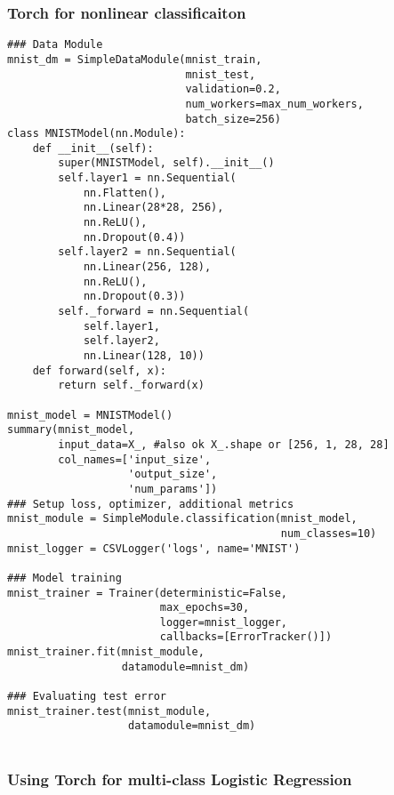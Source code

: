 \documentclass[
  letterpaper,
  DIV=11,
  numbers=noendperiod]{scrreprt}
\begin{document}
\subsubsection{Torch for nonlinear
classificaiton}\label{torch-for-nonlinear-classificaiton}

\begin{verbatim}
### Data Module
mnist_dm = SimpleDataModule(mnist_train,
                            mnist_test,
                            validation=0.2,
                            num_workers=max_num_workers,
                            batch_size=256)
class MNISTModel(nn.Module):
    def __init__(self):
        super(MNISTModel, self).__init__()
        self.layer1 = nn.Sequential(
            nn.Flatten(),
            nn.Linear(28*28, 256),
            nn.ReLU(),
            nn.Dropout(0.4))
        self.layer2 = nn.Sequential(
            nn.Linear(256, 128),
            nn.ReLU(),
            nn.Dropout(0.3))
        self._forward = nn.Sequential(
            self.layer1,
            self.layer2,
            nn.Linear(128, 10))
    def forward(self, x):
        return self._forward(x)

mnist_model = MNISTModel()
summary(mnist_model,
        input_data=X_, #also ok X_.shape or [256, 1, 28, 28]
        col_names=['input_size',
                   'output_size',
                   'num_params'])
### Setup loss, optimizer, additional metrics
mnist_module = SimpleModule.classification(mnist_model,
                                           num_classes=10)
mnist_logger = CSVLogger('logs', name='MNIST')

### Model training
mnist_trainer = Trainer(deterministic=False,
                        max_epochs=30,
                        logger=mnist_logger,
                        callbacks=[ErrorTracker()])
mnist_trainer.fit(mnist_module,
                  datamodule=mnist_dm)

### Evaluating test error
mnist_trainer.test(mnist_module,
                   datamodule=mnist_dm)
                   
\end{verbatim}

\subsubsection{Using Torch for multi-class Logistic
Regression}\label{using-torch-for-multi-class-logistic-regression}
\end{document}

